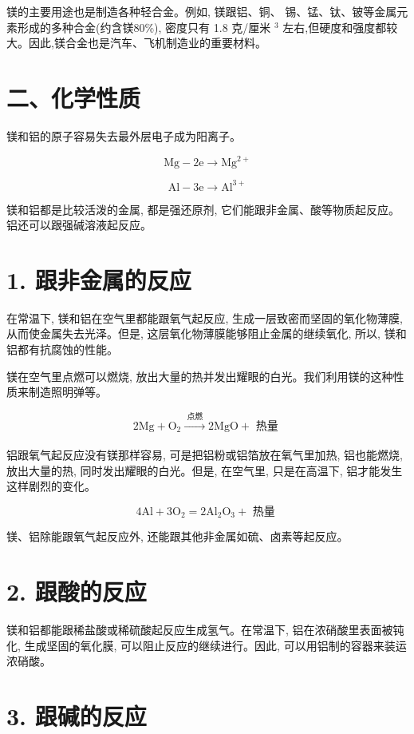 \documentclass[10pt]{article}
\begin{document}
镁的主要用途也是制造各种轻合金。例如, 镁跟铝、铜、 锡、锰、钛、铍等金属元素形成的多种合金(约含镁80\%), 密度只有 1.8 克/厘米 \({}^{3}\) 左右,但硬度和强度都较大。因此,镁合金也是汽车、飞机制造业的重要材料。

\section*{二、化学性质}

镁和铝的原子容易失去最外层电子成为阳离子。

\[
\mathrm{{Mg}} - 2\mathrm{e} \rightarrow {\mathrm{{Mg}}}^{2 + }
\]

\[
\mathrm{{Al}} - 3\mathrm{e} \rightarrow {\mathrm{{Al}}}^{3 + }
\]

镁和铝都是比较活泼的金属, 都是强还原剂, 它们能跟非金属、酸等物质起反应。铝还可以跟强碱溶液起反应。

\section*{1. 跟非金属的反应}

在常温下, 镁和铝在空气里都能跟氧气起反应, 生成一层致密而坚固的氧化物薄膜, 从而使金属失去光泽。但是, 这层氧化物薄膜能够阻止金属的继续氧化, 所以, 镁和铝都有抗腐蚀的性能。

镁在空气里点燃可以燃烧, 放出大量的热并发出耀眼的白光。我们利用镁的这种性质来制造照明弹等。

\[
2\mathrm{{Mg}} + {\mathrm{O}}_{2}\xrightarrow[]{\text{ 点燃 }}2\mathrm{{MgO}} + \text{ 热量 }
\]

铝跟氧气起反应没有镁那样容易, 可是把铝粉或铝箔放在氧气里加热, 铝也能燃烧, 放出大量的热, 同时发出耀眼的白光。但是, 在空气里, 只是在高温下, 铝才能发生这样剧烈的变化。

\[
4\mathrm{{Al}} + 3{\mathrm{O}}_{2} = 2{\mathrm{{Al}}}_{2}{\mathrm{O}}_{3} + \text{ 热量 }
\]

镁、铝除能跟氧气起反应外, 还能跟其他非金属如硫、卤素等起反应。

\section*{2. 跟酸的反应}

镁和铝都能跟稀盐酸或稀硫酸起反应生成氢气。在常温下, 铝在浓硝酸里表面被钝化, 生成坚固的氧化膜, 可以阻止反应的继续进行。因此, 可以用铝制的容器来装运浓硝酸。

\section*{3. 跟碱的反应}
\end{document}
